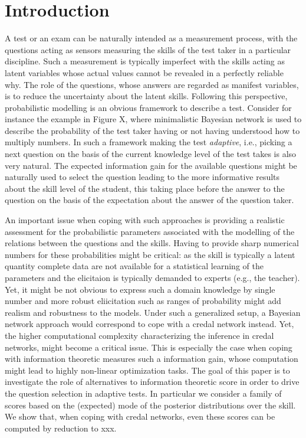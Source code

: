 \documentclass[runningheads]{llncs}
\begin{document}
\section{Introduction}
A test or an exam can be naturally intended as a measurement process, with the questions acting as sensors measuring the skills of the test taker in a particular discipline. Such a measurement is typically imperfect with the skills acting as latent variables whose actual values cannot be revealed in a perfectly reliable why. The role of the questions, whose answers are regarded as manifest variables, is to reduce the uncertainty about the latent skills. Following this perspective, probabilistic modelling is an obvious framework to describe a test. Consider for instance the example in Figure X, where minimalistic Bayesian network is used to describe the probability of the test taker having or not having understood how to multiply numbers. In such a framework making the test \emph{adaptive}, i.e., picking a next question on the basis of the current knowledge level of the test takes is also very natural. The expected information gain for the available questions might be naturally used to select the question leading to the more informative results about the skill level of the student, this taking place before the answer to the question on the basis of the expectation about the answer of the question taker. 

An important issue when coping with such approaches is providing a realistic assessment for the probabilistic parameters associated with the modelling of the relations between the questions and the skills. Having to provide sharp numerical numbers for these probabilities might be critical: as the skill is typically a latent quantity complete data are not available for a statistical learning of the parameters and the elicitaion is typically demanded to experts (e.g., the teacher). Yet, it might be not obvious to express such a domain knowledge by single number and more robust eliicitation such as ranges of probability might add realism and robustness to the models. Under such a generalized setup, a Bayesian network approach would correspond to cope with a credal network instead. Yet, the higher computational complexity characterizing the inference in credal networks, might become a critical issue. This is especially the case when coping with information theoretic measures such a information gain, whose computation might lead to highly non-linear optimization tasks. The goal of this paper is to investigate the role of alternatives to information theoretic score in order to drive the question selection in adaptive tests. In particular we consider a family of scores based on the (expected) mode of the posterior distributions over the skill. We show that, when coping with credal networks, even these scores can be computed by reduction to xxx.
\end{document}
